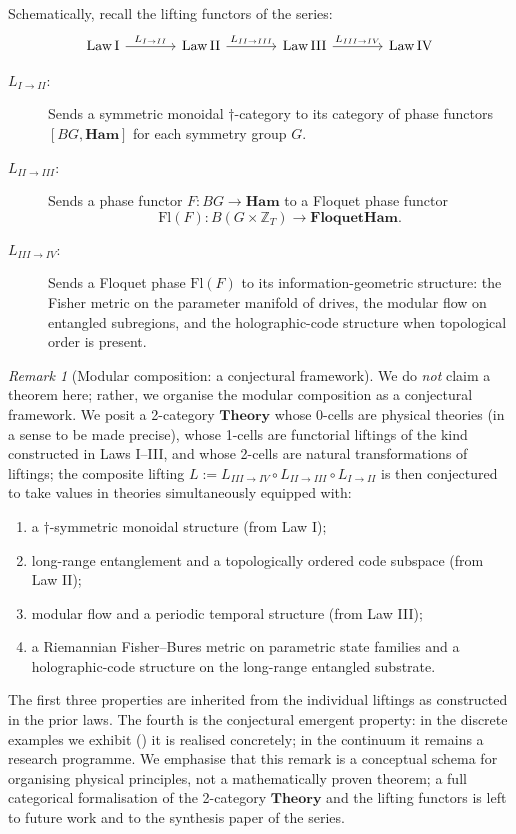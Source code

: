 \documentclass[12pt]{article}
\theoremstyle{definition}
\theoremstyle{remark}
\newtheorem{remark}[theorem]{Remark}
\newcommand{\Ham}{\mathbf{Ham}}
\begin{document}
Schematically, recall the lifting functors of the series:
\[
\begin{tikzcd}[column sep=large]
\mathrm{Law\,I}
   \arrow[r, "L_{I\to II}"]
& \mathrm{Law\,II}
   \arrow[r, "L_{II\to III}"]
& \mathrm{Law\,III}
   \arrow[r, "L_{III\to IV}"]
& \mathrm{Law\,IV}
\end{tikzcd}
\]

\begin{description}
  \item[$L_{I\to II}$:] Sends a symmetric monoidal $\dagger$-category to its category of phase functors $[BG, \Ham]$ for each symmetry group $G$.
  \item[$L_{II\to III}$:] Sends a phase functor $F\colon BG \to \Ham$ to a Floquet phase functor
    \[
      \mathrm{Fl}(F)\colon B(G\times \mathbb{Z}_T) \to \mathbf{FloquetHam}.
    \]
  \item[$L_{III\to IV}$:] Sends a Floquet phase $\mathrm{Fl}(F)$ to its information-geometric structure: the Fisher metric on the parameter manifold of drives, the modular flow on entangled subregions, and the holographic-code structure when topological order is present.
\end{description}

\begin{remark}[Modular composition: a conjectural framework]
\label{rem:composition}
We do \emph{not} claim a theorem here; rather, we organise the modular composition as a conjectural framework. We posit a 2-category $\mathbf{Theory}$ whose 0-cells are physical theories (in a sense to be made precise), whose 1-cells are functorial liftings of the kind constructed in Laws I--III, and whose 2-cells are natural transformations of liftings; the composite lifting $L := L_{III\to IV} \circ L_{II\to III} \circ L_{I\to II}$ is then conjectured to take values in theories simultaneously equipped with:
\begin{enumerate}
  \item a $\dagger$-symmetric monoidal structure (from Law I);
  \item long-range entanglement and a topologically ordered code subspace (from Law II);
  \item modular flow and a periodic temporal structure (from Law III);
  \item a Riemannian Fisher--Bures metric on parametric state families and a holographic-code structure on the long-range entangled substrate.
\end{enumerate}
The first three properties are inherited from the individual liftings as constructed in the prior laws. The fourth is the conjectural emergent property: in the discrete examples we exhibit () it is realised concretely; in the continuum it remains a research programme. We emphasise that this remark is a conceptual schema for organising physical principles, not a mathematically proven theorem; a full categorical formalisation of the 2-category $\mathbf{Theory}$ and the lifting functors is left to future work and to the synthesis paper of the series.
\end{remark}
\end{document}
